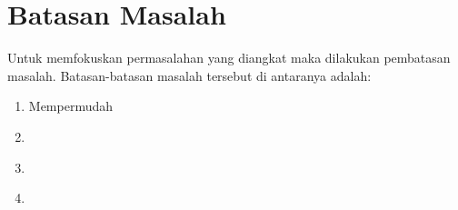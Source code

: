 \section{Batasan Masalah}
\label{sec:batasanmasalah}

Untuk memfokuskan permasalahan yang diangkat maka dilakukan pembatasan masalah.
Batasan-batasan masalah tersebut di antaranya adalah:

\begin{enumerate}[nolistsep]

  \item Mempermudah \textcolor{red}{\lipsum[2][1-3]}

  \item \textcolor{red}{\lipsum[3][1-5]}

  \item \textcolor{red}{\lipsum[4][1-4]}

  \item \textcolor{red}{\lipsum[5][1-3]}

\end{enumerate}
